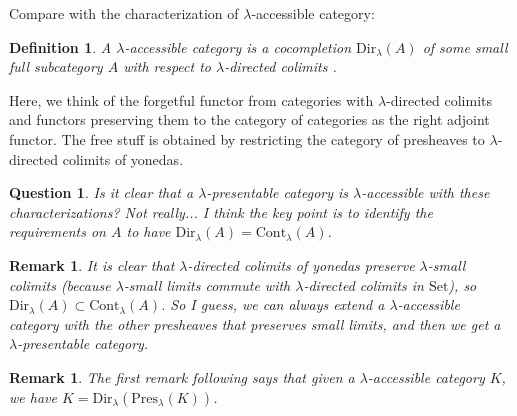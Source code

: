\documentclass{article}
\newcommand{\CC}{\mathsf{C}}
\newcommand{\Cont}[1]{\text{Cont}_{#1}}
\newcommand{\Dir}[1]{\text{Dir}_{#1}}
\newcommand{\Pres}[1]{\text{Pres}_{#1}}
\newcommand{\Set}{\text{Set}}
\newtheorem{definition}[theorem]{Definition}
\newtheorem{question}[theorem]{Question}
\newtheorem{remark}[theorem]{Remark}
\begin{document}
  Compare with the characterization of $\lambda$-accessible category:
  \begin{definition}
	  A $\lambda$-accessible category is a cocompletion $\Dir\lambda(A)$ of some small full subcategory $A$ with respect to $\lambda$-directed colimits
  \cite[Representation theorem 2.26]{adamek_rosicky}. 
  \end{definition}
  Here, we think of the forgetful functor from categories with $\lambda$-directed colimits and functors preserving them to the category of categories as the right adjoint functor.
  The free stuff is obtained by restricting the category of presheaves to $\lambda$-directed colimits of yonedas.
  \begin{question}
   Is it clear that a $\lambda$-presentable category is $\lambda$-accessible
   with these characterizations? Not really...
	  I think the key point is to identify the requirements on $A$ to have $\Dir\lambda(A) = 
	  \Cont\lambda(A)$.
  \end{question}
  \begin{remark}
	  It is clear that $\lambda$-directed colimits of yonedas preserve $\lambda$-small colimits
	  (because $\lambda$-small limits commute with $\lambda$-directed colimits in $\Set$),
	  so $\Dir\lambda(A)\subset \Cont\lambda(A)$.
	  So I guess, we can always extend a $\lambda$-accessible category with the other presheaves that preserves small limits, and then we get a $\lambda$-presentable category.
  \end{remark}
  \begin{remark}
	  The first remark following
  \cite[Representation theorem 2.26]{adamek_rosicky} says that given a $\lambda$-accessible category
	  $K$, we have $K = \Dir\lambda(\Pres\lambda(K))$.
  \end{remark}
\end{document}
